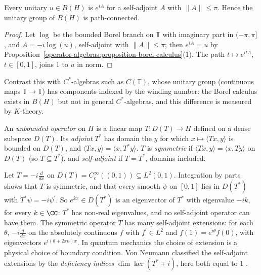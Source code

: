 \begin{corollary}\label{operator-algebras:corollary-unitary-group-connected}
Every unitary $u \in B(H)$ is $e^{iA}$ for a self-adjoint $A$ with $\|A\| \leq \pi$. Hence the unitary group of $B(H)$ is path-connected.
\end{corollary}

\begin{proof}
Let $\log$ be the bounded Borel branch on $\mathbb{T}$ with imaginary part in $(-\pi, \pi]$, and $A = -i\log(u)$, self-adjoint with $\|A\| \leq \pi$; then $e^{iA} = u$ by Proposition~\ref{operator-algebras:proposition-borel-calculus}(1).
The path $t \mapsto e^{itA}$, $t \in [0, 1]$, joins $1$ to $u$ in norm.
\end{proof}

Contrast this with $C^*$-algebras such as $C(\mathbb{T})$, whose unitary group (continuous maps $\mathbb{T} \to \mathbb{T}$) has components indexed by the winding number: the Borel calculus exists in $B(H)$ but not in
general $C^*$-algebras, and this difference is measured by $K$-theory.

\begin{definition}\label{operator-algebras:definition-unbounded}
An \emph{unbounded operator} on $H$ is a linear map $T \colon D(T) \to H$ defined on a dense subspace $D(T)$. Its \emph{adjoint} $T^*$ has domain the $y$ for which $x \mapsto \langle Tx, y\rangle$ is bounded on $D(T)$, and
$\langle Tx, y\rangle = \langle x, T^*y\rangle$. $T$ is \emph{symmetric} if $\langle Tx, y\rangle = \langle x, Ty\rangle$ on $D(T)$ (so $T \subseteq T^*$), and \emph{self-adjoint} if $T = T^*$, domains included.
\end{definition}

\begin{counterexample}\label{operator-algebras:counterexample-symmetric-not-self-adjoint}
Let $T = -i\frac{d}{dx}$ on $D(T) = C_c^\infty((0, 1)) \subseteq L^2(0, 1)$. Integration by parts shows that $T$ is symmetric, and that every smooth $\psi$ on $[0, 1]$ lies in $D(T^*)$ with $T^*\psi = -i\psi^{\prime}$. So
$e^{kx} \in D(T^*)$ is an eigenvector of $T^*$ with eigenvalue $-ik$, for every $k \in \CC$: $T^*$ has non-real eigenvalues, and no self-adjoint operator can have them. The symmetric operator $T$ has many self-adjoint
extensions: for each $\theta$, $-i\frac{d}{dx}$ on the absolutely continuous $f$ with $f^{\prime} \in L^2$ and $f(1) = e^{i\theta}f(0)$, with eigenvectors $e^{i(\theta + 2\pi n)x}$. In quantum mechanics the choice of
extension is a physical choice of boundary condition. Von Neumann classified the self-adjoint extensions by the \emph{deficiency indices} $\dim\ker(T^* \mp i)$, here both equal to $1$ \cite{reed-simon-1}.
\end{counterexample}

